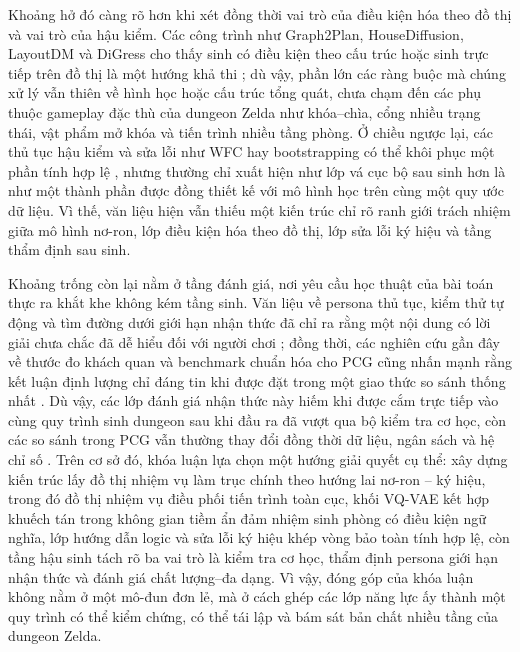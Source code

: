 \documentclass[oneside,a4paper,12pt]{extreport}
\begin{document}
Khoảng hở đó càng rõ hơn khi xét đồng thời vai trò của điều kiện hóa theo đồ thị và vai trò của hậu kiểm. Các công trình như Graph2Plan, HouseDiffusion, LayoutDM và DiGress cho thấy sinh có điều kiện theo cấu trúc hoặc sinh trực tiếp trên đồ thị là một hướng khả thi \cite{hu2020graph2plan,shabani2023housediffusion,inoue2023layoutdm,vignac2023digress}; dù vậy, phần lớn các ràng buộc mà chúng xử lý vẫn thiên về hình học hoặc cấu trúc tổng quát, chưa chạm đến các phụ thuộc gameplay đặc thù của dungeon Zelda như khóa--chìa, cổng nhiều trạng thái, vật phẩm mở khóa và tiến trình nhiều tầng phòng. Ở chiều ngược lại, các thủ tục hậu kiểm và sửa lỗi như WFC hay bootstrapping có thể khôi phục một phần tính hợp lệ \cite{karth2021wfc,rodriguez2019bootstrapping}, nhưng thường chỉ xuất hiện như lớp vá cục bộ sau sinh hơn là như một thành phần được đồng thiết kế với mô hình học trên cùng một quy ước dữ liệu. Vì thế, văn liệu hiện vẫn thiếu một kiến trúc chỉ rõ ranh giới trách nhiệm giữa mô hình nơ-ron, lớp điều kiện hóa theo đồ thị, lớp sửa lỗi ký hiệu và tầng thẩm định sau sinh.

Khoảng trống còn lại nằm ở tầng đánh giá, nơi yêu cầu học thuật của bài toán thực ra khắt khe không kém tầng sinh. Văn liệu về persona thủ tục, kiểm thử tự động và tìm đường dưới giới hạn nhận thức đã chỉ ra rằng một nội dung có lời giải chưa chắc đã dễ hiểu đối với người chơi \cite{holmgard2018proceduralpersonas,ariyurek2023beyondpersonas,rahmani2022humanlikepath,dubey2022cognitivepath,callaway2022cognitiveresources,lancia2023inforl}; đồng thời, các nghiên cứu gần đây về thước đo khách quan và benchmark chuẩn hóa cho PCG cũng nhấn mạnh rằng kết luận định lượng chỉ đáng tin khi được đặt trong một giao thức so sánh thống nhất \cite{beukman2022objective,khalifa2025pcgbenchmark}. Dù vậy, các lớp đánh giá nhận thức này hiếm khi được cắm trực tiếp vào cùng quy trình sinh dungeon sau khi đầu ra đã vượt qua bộ kiểm tra cơ học, còn các so sánh trong PCG vẫn thường thay đổi đồng thời dữ liệu, ngân sách và hệ chỉ số \cite{summerville2018pcgml,mouret2015mapelites,vassiliades2017cvt,fontaine2020cma}. Trên cơ sở đó, khóa luận lựa chọn một hướng giải quyết cụ thể: xây dựng kiến trúc lấy đồ thị nhiệm vụ làm trục chính theo hướng lai nơ-ron -- ký hiệu, trong đó đồ thị nhiệm vụ điều phối tiến trình toàn cục, khối VQ-VAE kết hợp khuếch tán trong không gian tiềm ẩn đảm nhiệm sinh phòng có điều kiện ngữ nghĩa, lớp hướng dẫn logic và sửa lỗi ký hiệu khép vòng bảo toàn tính hợp lệ, còn tầng hậu sinh tách rõ ba vai trò là kiểm tra cơ học, thẩm định persona giới hạn nhận thức và đánh giá chất lượng--đa dạng. Vì vậy, đóng góp của khóa luận không nằm ở một mô-đun đơn lẻ, mà ở cách ghép các lớp năng lực ấy thành một quy trình có thể kiểm chứng, có thể tái lập và bám sát bản chất nhiều tầng của dungeon Zelda.
\end{document}
